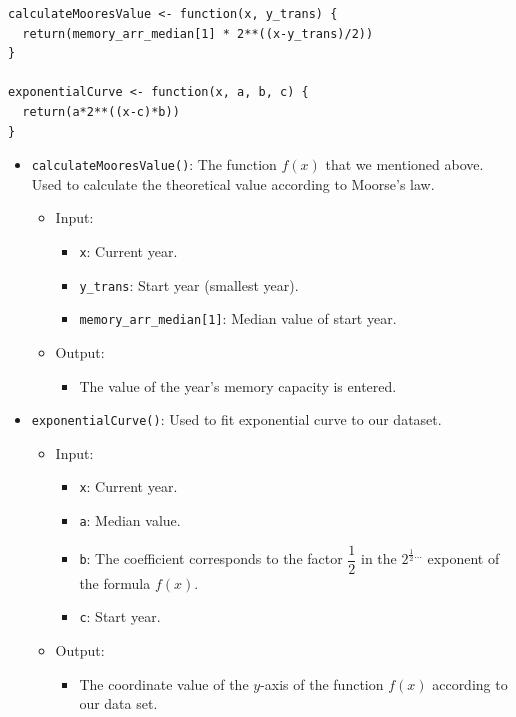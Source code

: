 \documentclass[a4paper]{article}
\begin{document}
\begin{mdframed}[leftline=false,rightline=false,backgroundcolor=lightblue!10,nobreak=false]
    \begin{verbatim}
calculateMooresValue <- function(x, y_trans) {
  return(memory_arr_median[1] * 2**((x-y_trans)/2))
}

exponentialCurve <- function(x, a, b, c) {
  return(a*2**((x-c)*b))
}
    \end{verbatim}
\end{mdframed}
\begin{itemize}
    \item \verb|calculateMooresValue()|: The function $f(x)$ that we mentioned above. Used to calculate the theoretical value according to Moorse's law.
    \begin{itemize}
        \item Input: 
        \begin{itemize}
            \item \verb|x|: Current year.
            \item \verb|y_trans|: Start year (smallest year).
            \item \verb|memory_arr_median[1]|: Median value of start year.
        \end{itemize}
        \item Output:
        \begin{itemize}
            \item The value of the year's memory capacity is entered.
        \end{itemize}
    \end{itemize}
    \item \verb|exponentialCurve()|: Used to fit exponential curve to  our dataset.
    \begin{itemize}
        \item Input:
        \begin{itemize}
            \item \verb|x|: Current year.
            \item \verb|a|: Median value.
            \item \verb|b|: The coefficient corresponds to the factor $\dfrac{1}{2}$ in the $2^{\frac{1}{2}...}$ exponent of the formula $f(x)$.
            \item \verb|c|: Start year.
        \end{itemize}
        \item Output:
        \begin{itemize}
            \item The coordinate value of the $y$-axis of the function $f(x)$ according to our data set.
        \end{itemize}
    \end{itemize}
\end{itemize}
\end{document}
